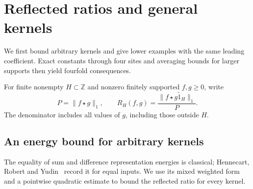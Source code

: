 \section{Reflected ratios and general kernels}
\label{sec:five-point}

We first bound arbitrary kernels and give lower examples with the same
leading coefficient. Exact constants through four sites and averaging
bounds for larger supports then yield fourfold consequences.

For finite nonempty $H\subset\mathbb Z$ and nonzero finitely supported
$f,g\ge0$, write
\[
 P=\|f\star g\|_1,\qquad
 R_H(f,g)=\frac{\|f\star\widetilde{g1_H}\|_1}{P}.
\]
The denominator includes all values of $g$, including those outside $H$.

\subsection{An energy bound for arbitrary kernels}

The equality of sum and difference representation energies is classical;
Hennecart, Robert and Yudin~\cite[p.~174, equation~(4)]{hry} record it for
equal inputs. We use its mixed weighted form and a pointwise quadratic
estimate to bound the reflected ratio for every kernel.


